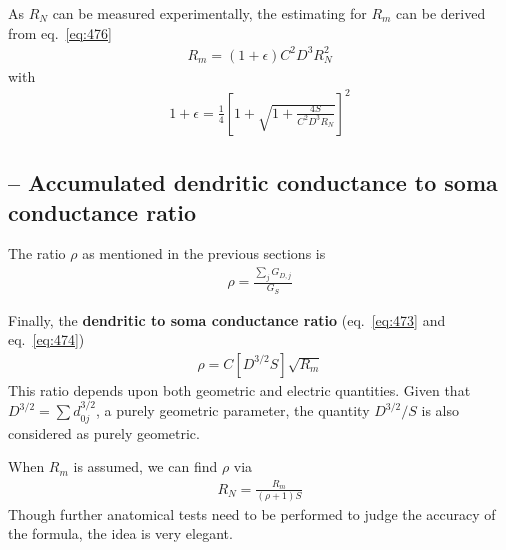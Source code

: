 As $R_N$ can be measured experimentally, the estimating for $R_m$ can
be derived from eq.~\eqref{eq:476}
\begin{eqnarray}
  \label{eq:477}
  R_m = (1+\epsilon) C^2 D^3 R_N^2
\end{eqnarray}
with 
\begin{eqnarray}
  \label{eq:478}
  1+\epsilon = \frac{1}{4}\left[ 1 + \sqrt{1+\frac{4S}{C^2D^3R_N}} \right]^2
\end{eqnarray}

\subsection{-- Accumulated dendritic conductance to soma conductance
  ratio}
\label{sec:dendr-soma-cond}

The ratio $\rho$ as mentioned in the previous sections is
\begin{eqnarray}
  \label{eq:531}
  \rho = \frac{\sum_j G_{D,j}}{G_S}
\end{eqnarray}

Finally, the {\bf dendritic to soma conductance ratio}
(eq.~\eqref{eq:473} and eq.~\eqref{eq:474})
\begin{eqnarray}
  \label{eq:479}
  \rho = C\left[D^{3/2}S \right]\sqrt{R_m}
\end{eqnarray}
This ratio depends upon both geometric and electric quantities. Given
that $D^{3/2} = \sum d_{0j}^{3/2}$, a purely geometric parameter, the
quantity $D^{3/2}/S$ is also considered as purely geometric.

When $R_m$ is assumed, we can find $\rho$ via
\begin{eqnarray}
  \label{eq:481}
  R_N = \frac{R_m}{(\rho+1)S}
\end{eqnarray}
Though further anatomical tests need to be performed to judge the
accuracy of the formula, the idea is very elegant.





